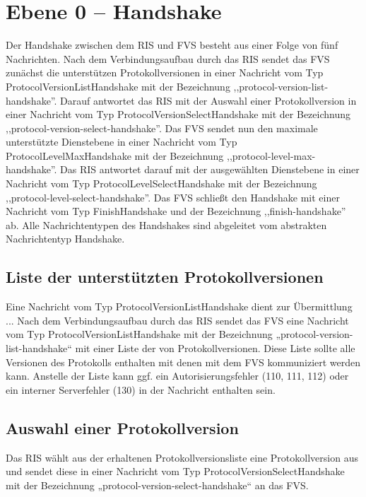 \section{Ebene 0 -- Handshake}
Der Handshake zwischen dem RIS und FVS besteht aus einer Folge von fünf Nachrichten. Nach dem Verbindungsaufbau durch das RIS sendet das FVS zunächst die unterstützen Protokollversionen in einer Nachricht vom Typ ProtocolVersionListHandshake mit der Bezeichnung ,,protocol-version-list-handshake''. Darauf antwortet das RIS mit der Auswahl einer Protokollversion in einer Nachricht vom Typ ProtocolVersionSelectHandshake mit der Bezeichnung ,,protocol-version-select-handshake''. Das FVS sendet nun den maximale unterstützte Dienstebene in einer Nachricht vom Typ ProtocolLevelMaxHandshake mit der Bezeichnung ,,protocol-level-max-handshake''. Das RIS antwortet darauf mit der ausgewählten Dienstebene in einer Nachricht vom Typ ProtocolLevelSelectHandshake mit der Bezeichnung ,,protocol-level-select-handshake''. Das FVS schließt den Handshake mit einer Nachricht vom Typ FinishHandshake und der Bezeichnung ,,finish-handshake'' ab. Alle Nachrichtentypen des Handshakes sind abgeleitet vom abstrakten Nachrichtentyp Handshake.



\subsection{Liste der unterstützten Protokollversionen}
Eine Nachricht vom Typ ProtocolVersionListHandshake dient zur Übermittlung ...
Nach dem Verbindungsaufbau durch das RIS sendet das FVS eine Nachricht vom Typ ProtocolVersionListHandshake mit der Bezeichnung „protocol-version-list-handshake“ mit einer Liste der von Protokollversionen. Diese Liste sollte alle Versionen des Protokolls enthalten mit denen mit dem FVS kommuniziert werden kann. Anstelle der Liste kann ggf. ein Autorisierungsfehler (110, 111, 112) oder ein interner Serverfehler (130) in der Nachricht enthalten sein.



\subsection{Auswahl einer Protokollversion}
Das RIS wählt aus der erhaltenen Protokollversionsliste eine Protokollversion aus und sendet diese in einer Nachricht vom Typ ProtocolVersionSelectHandshake mit der Bezeichnung „protocol-version-select-handshake“ an das FVS.

